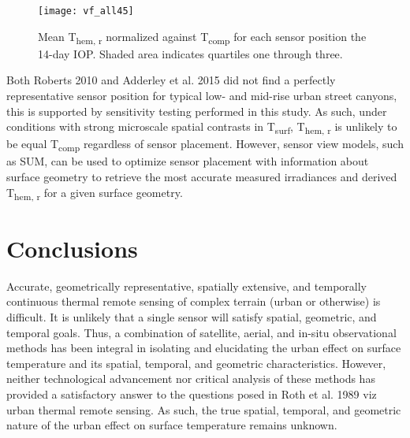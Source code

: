   \begin{figure}[H]
	\centering
	\texttt{[image: vf\_all45]}
	\caption{Mean T\textsubscript{hem, r} normalized against T\textsubscript{comp} for each sensor position the 14-day IOP. Shaded area indicates quartiles one through three.}
	\label{vf_all45}
\end{figure}
 
Both Roberts 2010 and Adderley et al. 2015 did not find a perfectly representative sensor position for typical low- and mid-rise urban street canyons, this is supported by sensitivity testing performed in this study. As such, under conditions with strong microscale spatial contrasts in T\textsubscript{surf}, T\textsubscript{hem, r} is unlikely to be equal T\textsubscript{comp} regardless of sensor placement. However, sensor view models, such as SUM, can be used to optimize sensor placement with information about surface geometry to retrieve the most accurate measured irradiances and derived T\textsubscript{hem, r} for a given surface geometry.
 
 \section{Conclusions}
 
Accurate, geometrically representative, spatially extensive, and temporally continuous thermal remote sensing of complex terrain (urban or otherwise) is difficult. It is unlikely that a single sensor will satisfy spatial, geometric, and temporal goals. Thus, a combination of satellite, aerial, and in-situ observational methods has been integral in isolating and elucidating the urban effect on surface temperature and its spatial, temporal, and geometric characteristics. However, neither technological advancement nor critical analysis of these methods has provided a satisfactory answer to the questions posed in Roth et al. 1989 viz urban thermal remote sensing. As such, the true spatial, temporal, and geometric nature of the urban effect on surface temperature remains unknown. 
 
